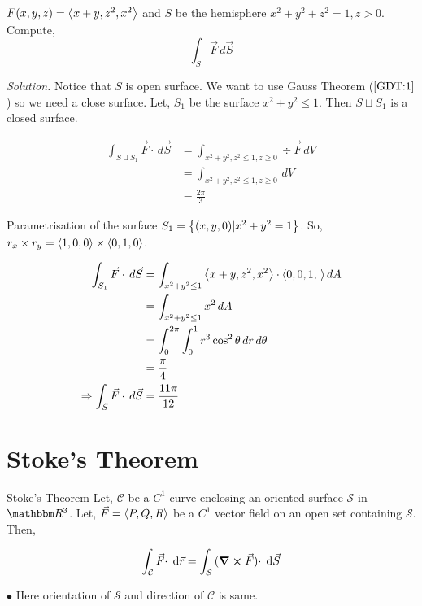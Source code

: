 \documentclass[Analysis-3]{subfiles}
\begin{document}
 \begin{Eg}{}{}
    $F (x,y,z) = \left\langle {x+y}, {z^2,x^2} \right\rangle$ and $S$ be the hemisphere $x^2+y^2+z^2 = 1 , z>0$. Compute,
    \[\int_{S} \vec{F} \,d \vec{S}\] 

    \textit{Solution.} Notice that $S$ is open surface. We want to  use Gauss Theorem ($\ref{GDT:1}$) so we need a close surface. Let, $S_1$ be the surface $x^2 +y^2 \le 1$. Then $S \sqcup S_1$ is a closed surface. 

    \begin{align*}
        \int_{S \sqcup S_1} \vec{F}\cdot \,d \vec{S} &= \int_{x^2+y^2,z^2 \le 1 , z \ge 0} \div \vec{F} \,dV \\
        &= \int_{x^2+y^2,z^2 \le 1 , z \ge 0}\,dV \\
        &= \frac{2\pi}{3}
    \end{align*}

    Parametrisation of the surface $S_1 =\qty{(x,y,0) | x^2+y^2 = 1}$. So, $r_x \times r_y = \left\langle {1,0}, {0} \right\rangle \times \left\langle {0,1}, {0} \right\rangle$.
    
    \begin{align*}
        \int_{S_1} \vec{F} \cdot \,d \vec{S} &= \int_{x^2+y^2 \le 1} \left\langle {x+y}, {z^2,x^2} \right\rangle \cdot \left\langle {0,0,1}, {\,} \right\rangle dA \\
        &= \int_{x^2+y^2 \le 1} x^2 \,dA\\
        &= \int_{0}^{2\pi} \int_{0}^{1} r^3 \cos^2 \theta \,dr \,d\theta \\
        &= \frac{\pi}{4} \\
       \Rightarrow \int_{S} \vec{F} \cdot \,d \vec{S} &= \frac{11\pi}{12}
    \end{align*}
 \end{Eg}

 \section{Stoke's Theorem}
\begin{Thm}{Stoke's Theorem}{}\label{ST}
    Let, $\mathcal{C}$ be a $C^1$ curve enclosing an oriented surface $\mathcal{S}$ in $\R^3$. Let,  $\vec{F} = \left\langle {P,Q}, {R} \right\rangle$ be a $C^1$ vector field on an open set containing $\mathcal{S}$. Then,
   
   \small \[\int_{\mathcal{C}} {\vec{F} \cdot } \hspace{0.1cm} \dd {\vec{r}} = \int_{\mathcal{S}} {(\curl \vec{F}) \cdot} \hspace{0.1cm} \dd {\vec{S}}  \]

    $\bullet$ Here orientation of $\mathcal{S}$ and direction of $\mathcal{C}$ is same.
\end{Thm}
\end{document}
